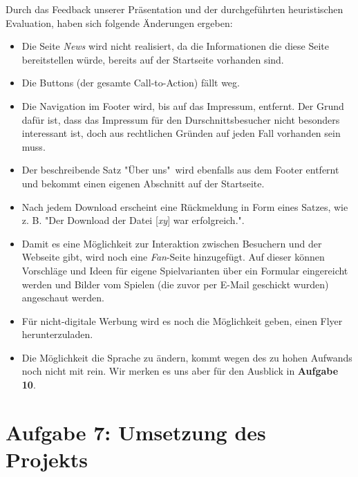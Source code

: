 \documentclass{scrartcl}
\begin{document}
Durch das Feedback unserer Präsentation und der durchgeführten heuristischen Evaluation, haben sich folgende Änderungen ergeben:
\begin{itemize}
\item Die Seite \textit{News} wird nicht realisiert, da die Informationen die diese Seite bereitstellen würde, bereits auf der Startseite vorhanden sind.
\item Die Buttons (der gesamte Call-to-Action) fällt weg.
\item Die Navigation im Footer wird, bis auf das Impressum, entfernt. Der Grund dafür ist, dass das Impressum für den Durschnittsbesucher nicht besonders interessant ist, doch aus rechtlichen Gründen auf jeden Fall vorhanden sein muss.
\item Der beschreibende Satz "Über uns"\ wird ebenfalls aus dem Footer entfernt und bekommt einen eigenen Abschnitt auf der Startseite.
\item Nach jedem Download erscheint eine Rückmeldung in Form eines Satzes, wie z. B. "Der Download der Datei [\textit{xy}] war erfolgreich.".
\item Damit es eine Möglichkeit zur Interaktion zwischen Besuchern und der Webseite gibt, wird noch eine \textit{Fan}-Seite hinzugefügt. Auf dieser können Vorschläge und Ideen für eigene Spielvarianten über ein Formular eingereicht werden und Bilder vom Spielen (die zuvor per E-Mail geschickt wurden) angeschaut werden.
\item Für nicht-digitale Werbung wird es noch die Möglichkeit geben, einen Flyer herunterzuladen.
\item Die Möglichkeit die Sprache zu ändern, kommt wegen des zu hohen Aufwands noch nicht mit rein. Wir merken es uns aber für den Ausblick in \textbf{Aufgabe 10}.
\end{itemize}

\section*{Aufgabe 7: Umsetzung des Projekts}
\end{document}
